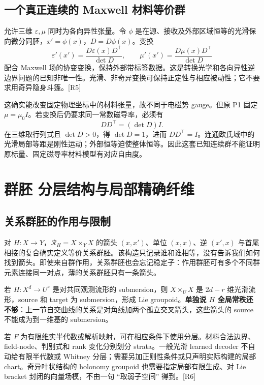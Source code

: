 \subsection{一个真正连续的 Maxwell 材料等价群}

允许三维 $\varepsilon,\mu$ 同时为各向异性张量。令 $\phi$ 是在源、接收及外部区域恒等的光滑保向微分同胚，$x'=\phi(x)$，$D=D\phi(x)$。变换
\begin{equation}
\varepsilon'(x')=\frac{D\varepsilon(x)D^\top}{\det D},\qquad
\mu'(x')=\frac{D\mu(x)D^\top}{\det D}
\end{equation}
配合 Maxwell 场的协变变换，保持外部带标签数据。这是转换光学和各向异性逆边界问题的已知非唯一性。光滑、非奇异变换可保持正定性与相应被动性；它不要求用奇异隐身斗篷。[R5]

这确实能改变固定物理坐标中的材料张量，故不同于电磁势 gauge。但原 P1 固定 $\mu=\mu_0I$。若变换后仍要求同一常数磁导率，必须有
\begin{equation}
DD^\top=(\det D)I.
\end{equation}
在三维取行列式且 $\det D>0$，得 $\det D=1$，进而 $DD^\top=I$。连通欧氏域中的光滑局部等距是刚性运动；外部恒等迫使整体恒等。因此这套已知连续群不能证明原标量、固定磁导率材料模型有对应自由度。

\section{群胚 分层结构与局部精确纤维}

\subsection{关系群胚的作用与限制}

对 $H:X\to Y$，$\mathcal R_H=X\times_YX$ 的箭头 $(x,x')$、单位 $(x,x)$、逆 $(x',x)$ 与首尾相接的复合确实定义等价关系群胚。该构造只记录谁和谁相等，没有告诉我们如何找到箭头。即使来自群作用，关系群胚也会忘记稳定子：作用群胚可有多个不同群元素连接同一对点，薄的关系群胚只有一条箭头。

若 $H:X^d\to U^r$ 是对共同观测流形的 submersion，则 $X\times_UX$ 是 $2d-r$ 维光滑流形，source 和 target 为 submersion，形成 Lie groupoid。\textbf{单独说 $H$ 全局常秩还不够}：上一节自交曲线的关系是对角线加两个孤立交叉箭头，这些箭头的 source 不能成为到一维基的 submersion。

若 $F$ 为有限维实半代数或解析映射，可在相应条件下使用分层。材料合法边界、field-node、判别式和 rank 变化分别划分 strata。一般光滑 learned decoder 不自动给有限半代数或 Whitney 分层；需要另加正则性条件或只声明实际构建的局部 chart。奇异叶状结构的 holonomy groupoid 也需要指定局部有限生成、对 Lie bracket 封闭的向量场模，不由一句 ``取弱子空间'' 得到。[R6]

